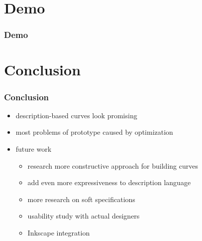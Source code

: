 \documentclass[mathserif]{beamer}
\begin{document}
	\section{Demo}


		\begin{frame}
			\frametitle{Demo}
		\end{frame}

	\section{Conclusion}

		\begin{frame}
			\frametitle{Conclusion}
			\begin{itemize}
				\item description-based curves look promising
				\item most problems of prototype caused by optimization
				\item future work
				\begin{itemize}
					\item research more constructive approach for building curves
					\item add even more expressiveness to description language
					\item more research on soft specifications
					\item usability study with actual designers
					\item Inkscape integration
				\end{itemize}
			\end{itemize}
		\end{frame}
\end{document}
